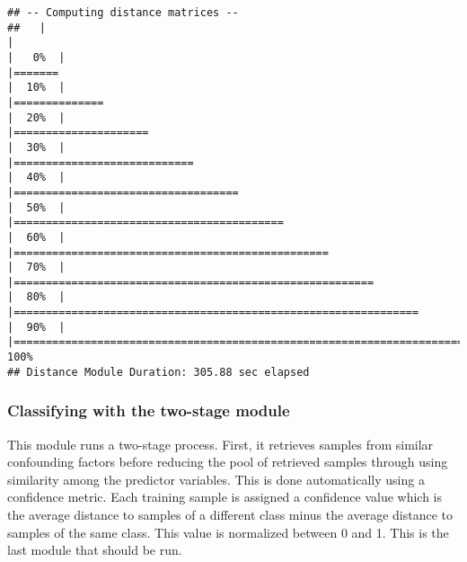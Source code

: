 \documentclass[
]{article}
\begin{document}
\begin{verbatim}
## -- Computing distance matrices --
##   |                                                                              |                                                                      |   0%  |                                                                              |=======                                                               |  10%  |                                                                              |==============                                                        |  20%  |                                                                              |=====================                                                 |  30%  |                                                                              |============================                                          |  40%  |                                                                              |===================================                                   |  50%  |                                                                              |==========================================                            |  60%  |                                                                              |=================================================                     |  70%  |                                                                              |========================================================              |  80%  |                                                                              |===============================================================       |  90%  |                                                                              |======================================================================| 100%
## Distance Module Duration: 305.88 sec elapsed
\end{verbatim}

\hypertarget{classifying-with-the-two-stage-module}{%
\subsubsection{Classifying with the two-stage
module}\label{classifying-with-the-two-stage-module}}

This module runs a two-stage process. First, it retrieves samples from
similar confounding factors before reducing the pool of retrieved
samples through using similarity among the predictor variables. This is
done automatically using a confidence metric. Each training sample is
assigned a confidence value which is the average distance to samples of
a different class minus the average distance to samples of the same
class. This value is normalized between 0 and 1. This is the last module
that should be run.
\end{document}
